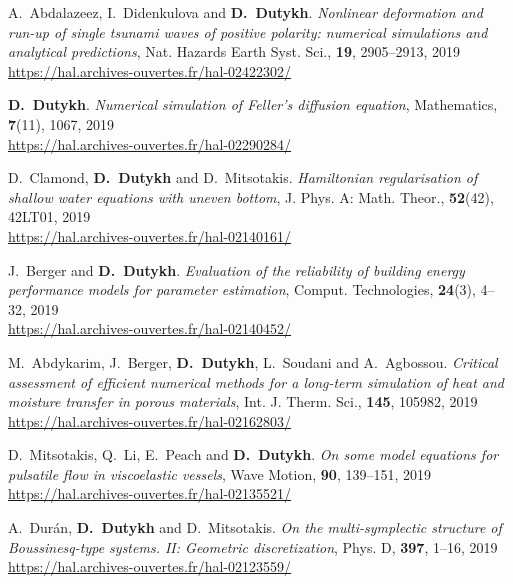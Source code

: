 \documentclass[final, a4paper, oneside, 12pt]{article}
\numberwithin{equation}{section}
\begin{document}
\begin{etaremune}
  
  \item A.~Abdalazeez, I.~Didenkulova and \textbf{D.~Dutykh}. \textit{Nonlinear deformation and run-up of single tsunami waves of positive polarity: numerical simulations and analytical predictions}, Nat. Hazards Earth Syst. Sci., \textbf{19}, 2905--2913, 2019 \\ %
  \url{https://hal.archives-ouvertes.fr/hal-02422302/}
  
  \item \textbf{D.~Dutykh}. \textit{Numerical simulation of Feller's diffusion equation}, Mathematics, \textbf{7}(11), 1067, 2019 \\ %
  \url{https://hal.archives-ouvertes.fr/hal-02290284/}
  
  \item D.~Clamond, \textbf{D.~Dutykh} and D.~Mitsotakis. \textit{Hamiltonian regularisation of shallow water equations with uneven bottom}, J. Phys. A: Math. Theor., \textbf{52}(42), 42LT01, 2019 \\ %
  \url{https://hal.archives-ouvertes.fr/hal-02140161/}
  
  \item J.~Berger and \textbf{D.~Dutykh}. \textit{Evaluation of the reliability of building energy performance models for parameter estimation}, Comput. Technologies, \textbf{24}(3), 4--32, 2019 \\ %
  \url{https://hal.archives-ouvertes.fr/hal-02140452/}
  
  \item M.~Abdykarim, J.~Berger, \textbf{D.~Dutykh}, L.~Soudani and A.~Agbossou. \textit{Critical assessment of efficient numerical methods for a long-term simulation of heat and moisture transfer in porous materials}, Int. J. Therm. Sci., \textbf{145}, 105982, 2019 \\ %
  \url{https://hal.archives-ouvertes.fr/hal-02162803/}
  
  \item D.~Mitsotakis, Q.~Li, E.~Peach and \textbf{D.~Dutykh}. \textit{On some model equations for pulsatile flow in viscoelastic vessels}, Wave Motion, \textbf{90}, 139--151, 2019 \\ %
  \url{https://hal.archives-ouvertes.fr/hal-02135521/}
  
  \item A.~Dur\'{a}n, \textbf{D.~Dutykh} and D.~Mitsotakis. \textit{On the multi-symplectic structure of Boussinesq-type systems. II: Geometric discretization}, Phys. D, \textbf{397}, 1--16, 2019 \\ %
  \url{https://hal.archives-ouvertes.fr/hal-02123559/}
  

\end{etaremune}
\end{document}

